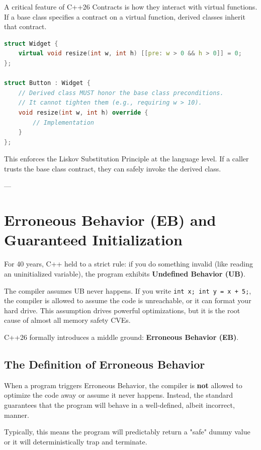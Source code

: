 {{{{A critical feature of C++26 Contracts is how they interact with virtual functions. If a base class specifies a contract on a virtual function, derived classes inherit that contract. 

\begin{lstlisting}[language=C++]
struct Widget {
    virtual void resize(int w, int h) [[pre: w > 0 && h > 0]] = 0;
};

struct Button : Widget {
    // Derived class MUST honor the base class preconditions.
    // It cannot tighten them (e.g., requiring w > 10).
    void resize(int w, int h) override {
        // Implementation
    }
};
\end{lstlisting}

This enforces the Liskov Substitution Principle at the language level. If a caller trusts the base class contract, they can safely invoke the derived class.

---

\section{Erroneous Behavior (EB) and Guaranteed Initialization}

For 40 years, C++ held to a strict rule: if you do something invalid (like reading an uninitialized variable), the program exhibits \textbf{Undefined Behavior (UB)}. 

The compiler assumes UB never happens. If you write \texttt{int x; int y = x + 5;}, the compiler is allowed to assume the code is unreachable, or it can format your hard drive. This assumption drives powerful optimizations, but it is the root cause of almost all memory safety CVEs.

C++26 formally introduces a middle ground: \textbf{Erroneous Behavior (EB)}.

\subsection{The Definition of Erroneous Behavior}

When a program triggers Erroneous Behavior, the compiler is \textbf{not} allowed to optimize the code away or assume it never happens. Instead, the standard guarantees that the program will behave in a well-defined, albeit incorrect, manner. 

Typically, this means the program will predictably return a "safe" dummy value or it will deterministically trap and terminate.

}}}}
